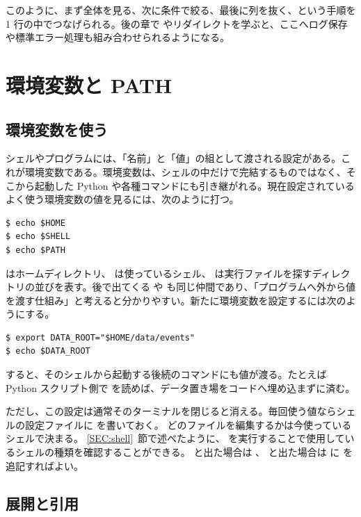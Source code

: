 このように、まず全体を見る、次に条件で絞る、最後に列を抜く、という手順を 1 行の中でつなげられる。後の章で  やリダイレクトを学ぶと、ここへログ保存や標準エラー処理も組み合わせられるようになる。

\section{環境変数と PATH}

\subsection{環境変数を使う}

シェルやプログラムには、「名前」と「値」の組として渡される設定がある。これが環境変数である。環境変数は、シェルの中だけで完結するものではなく、そこから起動した Python や各種コマンドにも引き継がれる。現在設定されているよく使う環境変数の値を見るには、次のように打つ。

\begin{lstlisting}[numbers=none, xleftmargin=2\zw]
$ echo $HOME
$ echo $SHELL
$ echo $PATH
\end{lstlisting}

 はホームディレクトリ、 は使っているシェル、 は実行ファイルを探すディレクトリの並びを表す。後で出てくる  や  も同じ仲間であり、「プログラムへ外から値を渡す仕組み」と考えると分かりやすい。新たに環境変数を設定するには次のようにする。

\begin{lstlisting}[numbers=none, xleftmargin=2\zw]
$ export DATA_ROOT="$HOME/data/events"
$ echo $DATA_ROOT
\end{lstlisting}

 すると、そのシェルから起動する後続のコマンドにも値が渡る。たとえば Python スクリプト側で  を読めば、データ置き場をコードへ埋め込まずに済む。

ただし、この設定は通常そのターミナルを閉じると消える。毎回使う値ならシェルの設定ファイルに  を書いておく。
どのファイルを編集するかは今使っているシェルで決まる。
\ref{SEC:shell}~節で述べたように、  を実行することで使用しているシェルの種類を確認することができる。
  と出た場合は 、 と出た場合は  に  を追記すればよい。

\subsection{展開と引用}

